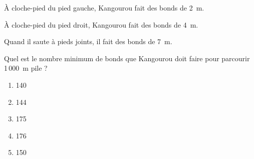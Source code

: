 \`A cloche-pied du pied gauche, Kangourou fait des bonds de 2~m.
\par\`A cloche-pied du pied droit, Kangourou fait des bonds de 4~m.
\par Quand il saute à pieds joints, il fait des bonds de 7~m.
\par Quel est le nombre minimum de bonds que Kangourou doit faire pour
parcourir 1\,000~m pile ?
\begin{multicols}{5}
  \begin{enumerate}[A/]
  \item 140
  \item 144
  \item 175
  \item 176
  \item 150
  \end{enumerate}
\end{multicols}